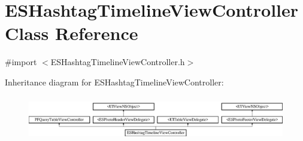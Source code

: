 \hypertarget{interface_e_s_hashtag_timeline_view_controller}{}\section{E\+S\+Hashtag\+Timeline\+View\+Controller Class Reference}
\label{interface_e_s_hashtag_timeline_view_controller}


{\ttfamily \#import $<$E\+S\+Hashtag\+Timeline\+View\+Controller.\+h$>$}

Inheritance diagram for E\+S\+Hashtag\+Timeline\+View\+Controller\+:\begin{figure}[H]
\begin{center}
\leavevmode
\includegraphics[height=1.981132cm]{interface_e_s_hashtag_timeline_view_controller}
\end{center}
\end{figure}
